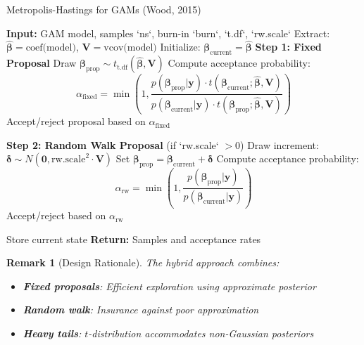 \documentclass[12pt]{article}
\newtheorem{remark}{Remark}
\begin{document}
\begin{algorithm}[H]
\caption{Metropolis-Hastings for GAMs (Wood, 2015)}
\begin{algorithmic}[1]
\State \textbf{Input:} GAM model, samples `ns`, burn-in `burn`, `t.df`, `rw.scale`
\State Extract: $\hat{\boldsymbol{\beta}} = \text{coef(model)}$, $\mathbf{V} = \text{vcov(model)}$
\State Initialize: $\boldsymbol{\beta}_{\text{current}} = \hat{\boldsymbol{\beta}}$
    \State \textbf{Step 1: Fixed Proposal}
    \State \quad Draw $\boldsymbol{\beta}_{\text{prop}} \sim t_{\text{t.df}}(\hat{\boldsymbol{\beta}}, \mathbf{V})$
    \State \quad Compute acceptance probability:
    \begin{equation}
    \alpha_{\text{fixed}} = \min\left(1, \frac{p(\boldsymbol{\beta}_{\text{prop}}|\mathbf{y}) \cdot t(\boldsymbol{\beta}_{\text{current}}; \hat{\boldsymbol{\beta}}, \mathbf{V})}{p(\boldsymbol{\beta}_{\text{current}}|\mathbf{y}) \cdot t(\boldsymbol{\beta}_{\text{prop}}; \hat{\boldsymbol{\beta}}, \mathbf{V})}\right)
    \end{equation}
    \State \quad Accept/reject proposal based on $\alpha_{\text{fixed}}$
    
    \State \textbf{Step 2: Random Walk Proposal} (if `rw.scale` $> 0$)
    \State \quad Draw increment: $\boldsymbol{\delta} \sim N(\mathbf{0}, \text{rw.scale}^2 \cdot \mathbf{V})$
    \State \quad Set $\boldsymbol{\beta}_{\text{prop}} = \boldsymbol{\beta}_{\text{current}} + \boldsymbol{\delta}$
    \State \quad Compute acceptance probability:
    \begin{equation}
    \alpha_{\text{rw}} = \min\left(1, \frac{p(\boldsymbol{\beta}_{\text{prop}}|\mathbf{y})}{p(\boldsymbol{\beta}_{\text{current}}|\mathbf{y})}\right)
    \end{equation}
    \State \quad Accept/reject based on $\alpha_{\text{rw}}$
    
        \State Store current state
    \EndIf
\EndFor
\State \textbf{Return:} Samples and acceptance rates
\end{algorithmic}
\end{algorithm}

\begin{remark}[Design Rationale]
The hybrid approach combines:
\begin{itemize}
    \item \textbf{Fixed proposals}: Efficient exploration using approximate posterior
    \item \textbf{Random walk}: Insurance against poor approximation
    \item \textbf{Heavy tails}: $t$-distribution accommodates non-Gaussian posteriors
\end{itemize}
\end{remark}
\end{document}
